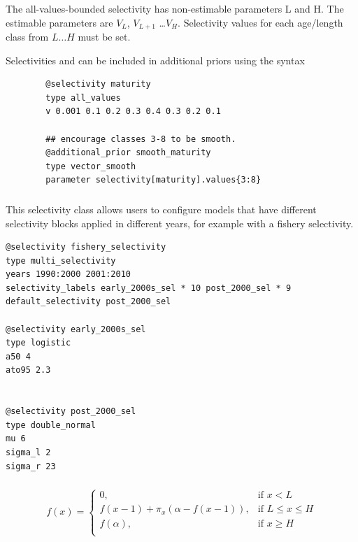 The all-values-bounded selectivity has non-estimable parameters L and H. The estimable parameters are $V_L$, $V_{L+1}$ \ldots $V_H$. Selectivity values for each age/length class from $L \ldots H$ must be set.

Selectivities  and  can be included in additional priors using the syntax

{\small{\begin{verbatim}
		@selectivity maturity
		type all_values
		v 0.001 0.1 0.2 0.3 0.4 0.3 0.2 0.1

		## encourage classes 3-8 to be smooth.
		@additional_prior smooth_maturity
		type vector_smooth
		parameter selectivity[maturity].values{3:8}
		\end{verbatim}}}

\subsubsection[Multi Selectivity ]{} \label{sec:Selectivity-MultiSelectivities}

This selectivity class allows users to configure models that have different selectivity blocks applied in different years, for example with a fishery selectivity.

{\small{\begin{verbatim}
@selectivity fishery_selectivity
type multi_selectivity
years 1990:2000 2001:2010
selectivity_labels early_2000s_sel * 10 post_2000_sel * 9
default_selectivity post_2000_sel

@selectivity early_2000s_sel
type logistic
a50 4
ato95 2.3


@selectivity post_2000_sel
type double_normal
mu 6
sigma_l 2
sigma_r 23
\end{verbatim}}}


\subsubsection[Increasing ]{} \label{sec:Selectivity-Increasing}

\begin{equation}
f(x)=\begin{cases}
	  0, & \text{if $x < L$} \\
	  f(x-1)+ \pi_x(\alpha-f(x-1)), & \text{if $L \le x \le H$} \\
	  f(\alpha), & \text{if $x \ge H$} \\
  \end{cases}
\end{equation}

